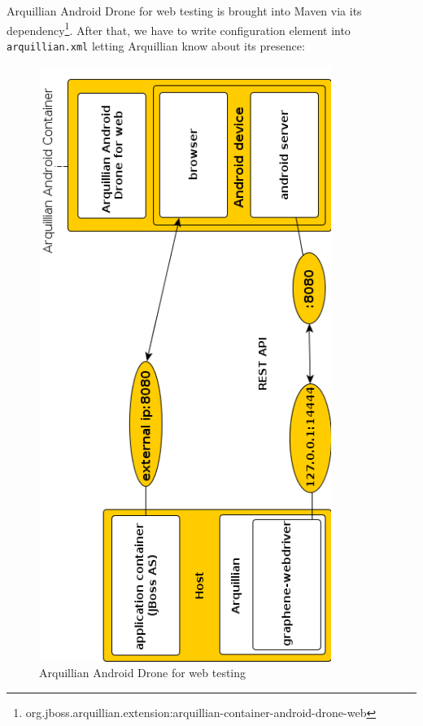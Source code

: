 \documentclass[12pt,final,oneside]{fithesis}
\begin{document}
Arquillian Android Drone for web testing is brought into Maven via its dependency\footnote{org.jboss.arquillian.extension:arquillian-container-android-drone-web}. After that, we have to write configuration element into \texttt{arquillian.xml} letting Arquillian know about its presence: 





\begin{figure}[!ht]
	\centering
	\includegraphics[origin=c,width=95mm]{img/webdriver2.png}
	\caption{Arquillian Android Drone for web testing}
	\label{fig:arquillian_drone_web}
\end{figure}
\end{document}
